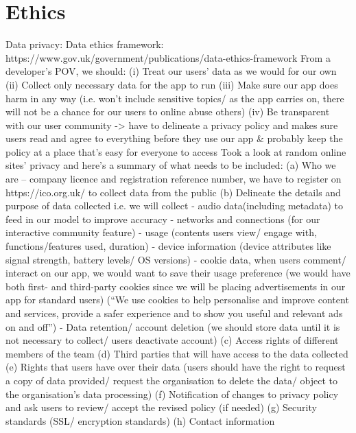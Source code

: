 \section{Ethics}
Data privacy:
Data ethics framework: https://www.gov.uk/government/publications/data-ethics-framework
From a developer’s POV, we should:
(i)	Treat our users’ data as we would for our own
(ii)	Collect only necessary data for the app to run
(iii)	Make sure our app does harm in any way (i.e. won’t include sensitive topics/ as the app carries on, there will not be a chance for our users to online abuse others)
(iv)	Be transparent with our user community -> have to delineate a privacy policy and makes sure users read and agree to everything before they use our app & probably keep the policy at a place that’s easy for everyone to access
Took a look at random online sites’ privacy and here’s a summary of what needs to be included:
(a)	Who we are – company licence and registration reference number, we have to register on https://ico.org.uk/ to collect data from the public
(b)	Delineate the details and purpose of data collected
i.e. we will collect 
- audio data(including metadata) to feed in our model to improve accuracy
- networks and connections (for our interactive community feature)
- usage (contents users view/ engage with, functions/features used, duration)
- device information (device attributes like signal strength, battery levels/ OS versions)
- cookie data, when users comment/ interact on our app, we would want to save their usage preference (we would have both first- and third-party cookies since we will be placing advertisements in our app for standard users) (“We use cookies to help personalise and improve content and services, provide a safer experience and to show you useful and relevant ads on and off”)
- Data retention/ account deletion (we should store data until it is not necessary to collect/ users deactivate account)
(c)	Access rights of different members of the team
(d)	Third parties that will have access to the data collected
(e)	Rights that users have over their data (users should have the right to request a copy of data provided/ request the organisation to delete the data/ object to the organisation’s data processing)
(f)	Notification of changes to privacy policy and ask users to review/ accept the revised policy (if needed)
(g)	Security standards (SSL/ encryption standards)
(h)	Contact information


